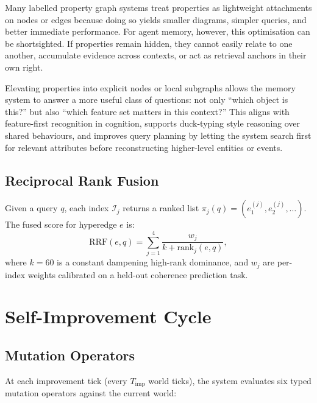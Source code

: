 \documentclass[11pt]{article}
\begin{document}
Many labelled property graph systems treat properties as lightweight attachments
on nodes or edges because doing so yields smaller diagrams, simpler queries, and
better immediate performance. For agent memory, however, this optimisation can be
shortsighted. If properties remain hidden, they cannot easily relate to one
another, accumulate evidence across contexts, or act as retrieval anchors in
their own right.

Elevating properties into explicit nodes or local subgraphs allows the memory
system to answer a more useful class of questions: not only ``which object is
this?'' but also ``which feature set matters in this context?'' This aligns with
feature-first recognition in cognition, supports duck-typing style reasoning over
shared behaviours, and improves query planning by letting the system search first
for relevant attributes before reconstructing higher-level entities or events.

\subsection{Reciprocal Rank Fusion}

Given a query $q$, each index $\mathcal{I}_j$ returns a ranked list
$\pi_j(q) = (e_1^{(j)}, e_2^{(j)}, \ldots)$. The fused score for hyperedge $e$
is:
\begin{equation}
  \text{RRF}(e, q) = \sum_{j=1}^{4} \frac{w_j}{k + \text{rank}_j(e, q)},
  \label{eq:rrf}
\end{equation}
where $k = 60$ is a constant dampening high-rank dominance, and $w_j$ are
per-index weights calibrated on a held-out coherence prediction task.

\section{Self-Improvement Cycle}
\label{sec:self_improve}

\subsection{Mutation Operators}

At each improvement tick (every $T_{\text{imp}}$ world ticks), the system
evaluates six typed mutation operators against the current world:
\end{document}
